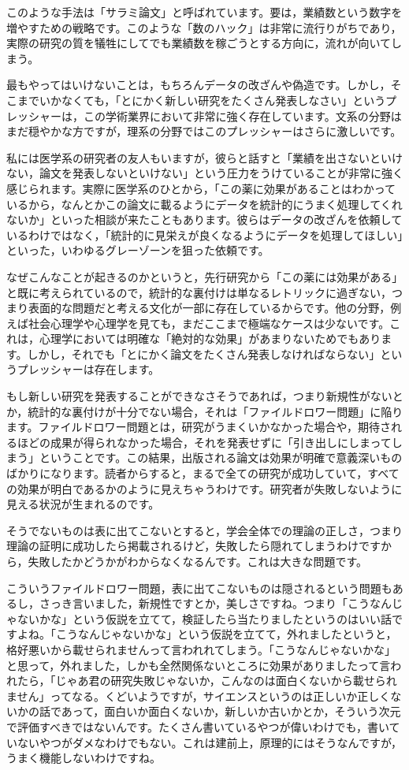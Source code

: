 \documentclass{ltjsbook}
\begin{document}
このような手法は「サラミ論文」と呼ばれています。要は，業績数という数字を増やすための戦略です。このような「数のハック」は非常に流行りがちであり，実際の研究の質を犠牲にしてでも業績数を稼ごうとする方向に，流れが向いてしまう。

最もやってはいけないことは，もちろんデータの改ざんや偽造です。しかし，そこまでいかなくても，「とにかく新しい研究をたくさん発表しなさい」というプレッシャーは，この学術業界において非常に強く存在しています。文系の分野はまだ穏やかな方ですが，理系の分野ではこのプレッシャーはさらに激しいです。

私には医学系の研究者の友人もいますが，彼らと話すと「業績を出さないといけない，論文を発表しないといけない」という圧力をうけていることが非常に強く感じられます。実際に医学系のひとから，「この薬に効果があることはわかっているから，なんとかこの論文に載るようにデータを統計的にうまく処理してくれないか」といった相談が来たこともあります。彼らはデータの改ざんを依頼しているわけではなく，「統計的に見栄えが良くなるようにデータを処理してほしい」といった，いわゆるグレーゾーンを狙った依頼です。

なぜこんなことが起きるのかというと，先行研究から「この薬には効果がある」と既に考えられているので，統計的な裏付けは単なるレトリックに過ぎない，つまり表面的な問題だと考える文化が一部に存在しているからです。他の分野，例えば社会心理学や心理学を見ても，まだここまで極端なケースは少ないです。これは，心理学においては明確な「絶対的な効果」があまりないためでもあります。しかし，それでも「とにかく論文をたくさん発表しなければならない」というプレッシャーは存在します。

もし新しい研究を発表することができなさそうであれば，つまり新規性がないとか，統計的な裏付けが十分でない場合，それは「ファイルドロワー問題」に陥ります。ファイルドロワー問題とは，研究がうまくいかなかった場合や，期待されるほどの成果が得られなかった場合，それを発表せずに「引き出しにしまってしまう」ということです。この結果，出版される論文は効果が明確で意義深いものばかりになります。読者からすると，まるで全ての研究が成功していて，すべての効果が明白であるかのように見えちゃうわけです。研究者が失敗しないように見える状況が生まれるのです。

そうでないものは表に出てこないとすると，学会全体での理論の正しさ，つまり理論の証明に成功したら掲載されるけど，失敗したら隠れてしまうわけですから，失敗したかどうかがわからなくなるんです。これは大きな問題です。

こういうファイルドロワー問題，表に出てこないものは隠されるという問題もあるし，さっき言いました，新規性ですとか，美しさですね。つまり「こうなんじゃないかな」という仮説を立てて，検証したら当たりましたというのはいい話ですよね。「こうなんじゃないかな」という仮説を立てて，外れましたというと，格好悪いから載せられませんって言われれてしまう。「こうなんじゃないかな」と思って，外れました，しかも全然関係ないところに効果がありましたって言われたら，「じゃあ君の研究失敗じゃないか，こんなのは面白くないから載せられません」ってなる。くどいようですが，サイエンスというのは正しいか正しくないかの話であって，面白いか面白くないか，新しいか古いかとか，そういう次元で評価すべきではないんです。たくさん書いているやつが偉いわけでも，書いていないやつがダメなわけでもない。これは建前上，原理的にはそうなんですが，うまく機能しないわけですね。
\end{document}
